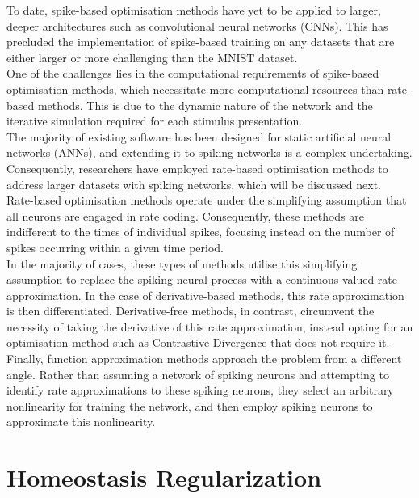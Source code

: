\noindent To date, spike-based optimisation methods have yet to be applied to larger, deeper architectures such as convolutional neural networks (CNNs). This has precluded the implementation of spike-based training on any datasets that are either larger or more challenging than the MNIST dataset. \\

\noindent One of the challenges lies in the computational requirements of spike-based optimisation methods, which necessitate more computational resources than rate-based methods. This is due to the dynamic nature of the network and the iterative simulation required for each stimulus presentation. \\

\noindent The majority of existing software has been designed for static artificial neural networks (ANNs), and extending it to spiking networks is a complex undertaking. Consequently, researchers have employed rate-based optimisation methods to address larger datasets with spiking networks, which will be discussed next. \\

\noindent Rate-based optimisation methods operate under the simplifying assumption that all neurons are engaged in rate coding. Consequently, these methods are indifferent to the times of individual spikes, focusing instead on the number of spikes occurring within a given time period. \\

\noindent In the majority of cases, these types of methods utilise this simplifying assumption to replace the spiking neural process with a continuous-valued rate approximation. In the case of derivative-based methods, this rate approximation is then differentiated. Derivative-free methods, in contrast, circumvent the necessity of taking the derivative of this rate approximation, instead opting for an optimisation method such as Contrastive Divergence that does not require it. \\

\noindent Finally, function approximation methods approach the problem from a different angle. Rather than assuming a network of spiking neurons and attempting to identify rate approximations to these spiking neurons, they select an arbitrary nonlinearity for training the network, and then employ spiking neurons to approximate this nonlinearity.


\section[Homeostasis Regularization]{Homeostasis Regularization}

